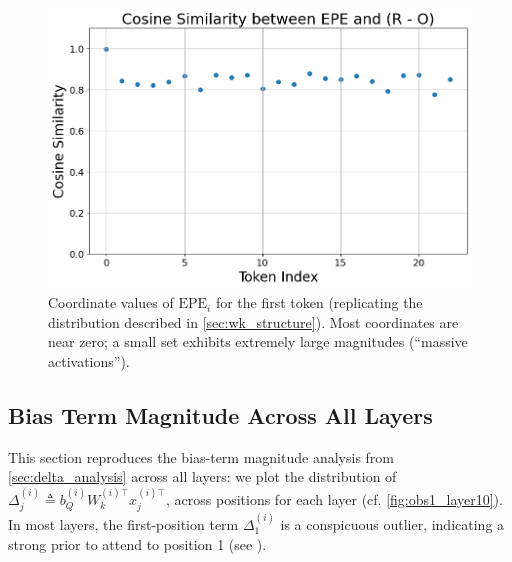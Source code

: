 \documentclass[11pt]{article}
\begin{document}
\begin{figure}[t]
  \includegraphics[width=\columnwidth]{figures/epe_exp.png}
  \caption{Coordinate values of $\mathrm{EPE}_i$ for the first token (replicating the distribution described in \cref{sec:wk_structure}). Most coordinates are near zero; a small set exhibits extremely large magnitudes (``massive activations'').}
  \label{fig:epe_exp}
\end{figure}

\subsection{Bias Term Magnitude Across All Layers}\label{app:bias_term}

This section reproduces the bias-term magnitude analysis from \cref{sec:delta_analysis} across all layers: we plot the distribution of $\Delta_j^{(i)} \triangleq b_Q^{(i)}W_k^{(i)\top} x_j^{(i)\top}$, across positions for each layer (cf. \cref{fig:obs1_layer10}). In most layers, the first-position term $\Delta_1^{(i)}$ is a conspicuous outlier, indicating a strong prior to attend to position 1 (see ).
\end{document}
